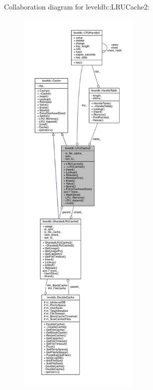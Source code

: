 Collaboration diagram for leveldb\+:\+:L\+R\+U\+Cache2\+:
\nopagebreak
\begin{figure}[H]
\begin{center}
\leavevmode
\includegraphics[height=550pt]{classleveldb_1_1_l_r_u_cache2__coll__graph}
\end{center}
\end{figure}
